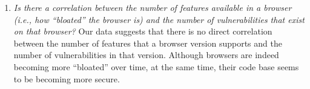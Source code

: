 \begin{enumerate}
\item {\em Is there a correlation between the number of features
    available in a browser (i.e., how ``bloated'' the browser is) and
    the number of vulnerabilities that exist on that browser?} Our
  data suggests that there is no direct correlation between the number
  of features that a browser version supports and the number of
  vulnerabilities in that version. Although browsers are indeed
  becoming more ``bloated'' over time, at the same time, their code
  base seems to be becoming more secure.    
    
\end{enumerate}

